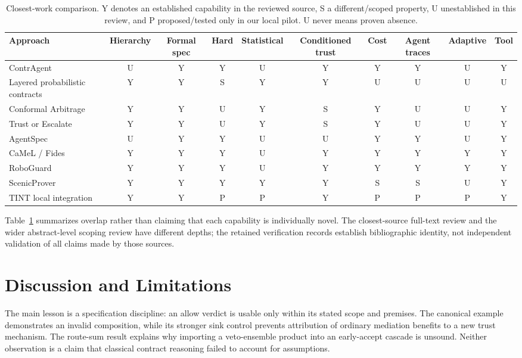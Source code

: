 \documentclass[lettersize,journal]{IEEEtran}
\begin{document}
\begin{table}[t]
\caption{Closest-work comparison. Y denotes an established capability in the
reviewed source, S a different/scoped property, U unestablished in this review,
and P proposed/tested only in our local pilot. U never means proven absence.}
\label{tab:gap}
\centering\scriptsize
\begin{tabular}{lccccccccc}
\hline
Approach & Hierarchy & Formal spec & Hard & Statistical & Conditioned trust & Cost & Agent traces & Adaptive & Tool\\
\hline
ContrAgent & U & Y & Y & U & Y & Y & Y & U & Y\\
Layered probabilistic contracts & Y & Y & S & Y & Y & U & U & U & U\\
Conformal Arbitrage & Y & Y & U & Y & S & Y & U & U & Y\\
Trust or Escalate & Y & Y & U & Y & S & Y & U & U & Y\\
AgentSpec & U & Y & Y & U & U & Y & Y & U & Y\\
CaMeL / Fides & Y & Y & Y & U & Y & Y & Y & Y & Y\\
RoboGuard & Y & Y & Y & U & Y & Y & Y & Y & Y\\
ScenicProver & Y & Y & Y & Y & Y & S & S & U & Y\\
TINT local integration & Y & Y & P & P & Y & P & P & P & Y\\
\hline
\end{tabular}
\end{table}

Table~\ref{tab:gap} summarizes overlap rather than claiming that each
capability is individually novel. The closest-source full-text review and the
wider abstract-level scoping review have different depths; the retained
verification records establish bibliographic identity, not independent
validation of all claims made by those sources.

\section{Discussion and Limitations}
The main lesson is a specification discipline: an allow verdict is usable
only within its stated scope and premises. The canonical example demonstrates
an invalid composition, while its stronger sink control prevents attribution
of ordinary mediation benefits to a new trust mechanism. The route-sum result
explains why importing a veto-ensemble product into an early-accept cascade is
unsound. Neither observation is a claim that classical contract reasoning
failed to account for assumptions.
\end{document}
